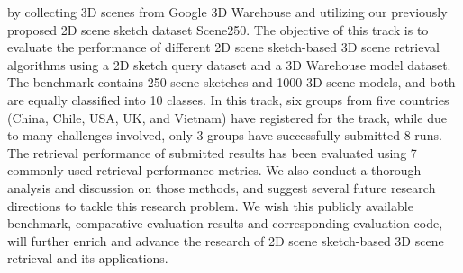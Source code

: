 

 by collecting 3D scenes from Google 3D Warehouse and utilizing our previously proposed 2D scene sketch dataset Scene250. The objective of this track is to evaluate the performance of different 2D scene sketch-based 3D scene retrieval algorithms using a 2D sketch query dataset and a 3D Warehouse model dataset. The benchmark contains 250 scene sketches and 1000 3D scene models, and both are equally classified into 10 classes. In this track,  six groups from five countries (China, Chile, USA, UK, and Vietnam) have registered for the track, while due to many challenges involved, only 3 groups have successfully submitted 8 runs. The retrieval performance of submitted results has been evaluated using 7 commonly used retrieval performance metrics. We also conduct a thorough analysis and discussion on those methods, and suggest several future research directions to tackle this research problem. We wish this publicly available~\cite{SHREC18-SceneSBR-Track} benchmark, comparative evaluation results and corresponding evaluation code, will further enrich and advance the research of 2D scene sketch-based 3D scene retrieval and its applications.

